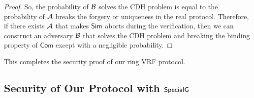 \begin{proof}
	So, the probability of $ \mathcal{B} $ solves the CDH problem is equal to the probability of $ \mathcal{A} $ breaks the forgery or uniqueness in the real protocol. Therefore,  if there exists $ \mathcal{A} $ that makes $ \mathsf{Sim}$ aborts during the verification, then we can construct an adversary $ \mathcal{B} $ that solves the CDH problem and breaking the binding property of $ \mathsf{Com} $ except with a negligible probability.
	
	
	
\end{proof}
This completes the security proof of our ring VRF protocol.\eprint{ \qed}{}



\subsection{Security of Our Protocol with $ {\mathsf{SpecialG}} $}
\label{ap:secondprotocolproof}
%


